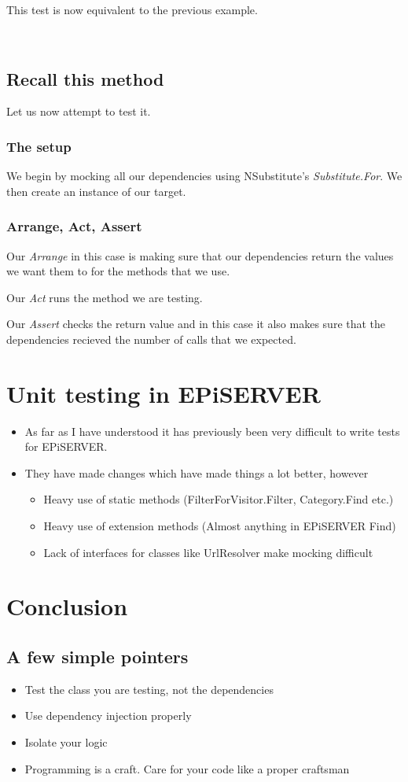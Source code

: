 \documentclass[12pt]{article}
\begin{document}
This test is now equivalent to the previous example.

~\\
\subsection{Recall this method}
Let us now attempt to test it.

\subsubsection{The setup}
We begin by mocking all our dependencies using NSubstitute's \emph{Substitute.For}. We then create an instance of our target.

\subsubsection{Arrange, Act, Assert}
Our \emph{Arrange} in this case is making sure that our dependencies return the values we want them to for the methods that we use.

Our \emph{Act} runs the method we are testing.

Our \emph{Assert} checks the return value and in this case it also makes sure that the dependencies recieved the number of calls that we expected.

\section{Unit testing in EPiSERVER}
\begin{itemize}
	\item As far as I have understood it has previously been very difficult to write tests for EPiSERVER.
	\item They have made changes which have made things a lot better, however
		\begin{itemize}
			\item Heavy use of static methods (FilterForVisitor.Filter, Category.Find etc.)
			\item Heavy use of extension methods (Almost anything in EPiSERVER Find)
			\item Lack of interfaces for classes like UrlResolver make mocking difficult
		\end{itemize}
\end{itemize}

\section{Conclusion}

\subsection{A few simple pointers}
\begin{itemize}
	\item Test the class you are testing, not the dependencies
	\item Use dependency injection properly
	\item Isolate your logic
	\item Programming is a craft. Care for your code like a proper
craftsman
\end{itemize}
\end{document}

